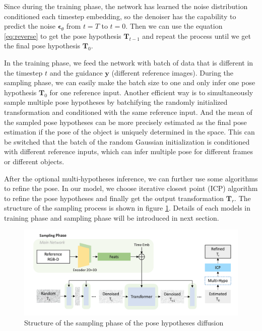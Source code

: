 \documentclass[12pt,DIV14,BCOR12mm,a4paper,footinclude=false,headinclude,parskip=half-,twoside,openright,cleardoublepage=empty,toc=index,bibliography=totoc,listof=totoc]{scrreprt}
\numberwithin{equation}{chapter}
\begin{document}
Since during the training phase, the network has learned the noise distribution conditioned each timestep embedding, so the denoiser has the capability to predict the noise $\boldsymbol{\epsilon}_{\theta}$ from $t=T$ to $t=0$. Then we can use the equation \ref{eq:reverse} to get the pose hypothesis $\mathbf{T}_{t-1}$ and repeat the process until we get the final pose hypothesis $\mathbf{T}_{0}$. 

In the training phase, we feed the network with batch of data that is different in the timestep $t$ and the guidance $\mathbf{y}$ (different reference images). During the sampling phase, we can easily make the batch size to one and only infer one pose hypothesis $\mathbf{T}_{0}$ for one reference input. Another efficient way is to simultaneously sample multiple pose hypotheses by batchifying the randomly initialized transformation and conditioned with the same reference input. And the mean of the sampled pose hypotheses can be more precisely estimated as the final pose estimation if the pose of the object is uniquely determined in the space. This can be switched that the batch of the random Gaussian initialization is conditioned with different reference inputs, which can infer multiple pose for different frames or different objects.

After the optional multi-hypotheses inference, we can further use some algorithms to refine the pose. In our model, we choose iterative closest point (ICP)\cite{121791} algorithm to refine the pose hypotheses and finally get the output transformation $\mathbf{T}_{r}$. The structure of the sampling process is shown in figure \ref{img:sample}. Details of each models in training phase and sampling phase will be introduced in next section.
\begin{figure}[h]
	\centering
	\includegraphics[scale=.23]{img/sample.png}
	\caption{Structure of the sampling phase of the pose hypotheses diffusion}
	\label{img:sample}
\end{figure}
\end{document}
